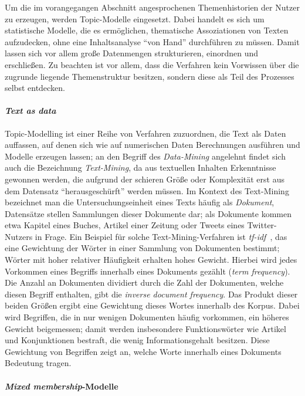 \documentclass[11pt,a4paper,twoside]{article}
\let\oldpar\paragraph
\renewcommand{\paragraph}{\oldpar*}
\begin{document}
Um die im vorangegangen Abschnitt angesprochenen Themenhistorien der
Nutzer zu erzeugen, werden Topic-Modelle eingesetzt. Dabei handelt es
sich um statistische Modelle, die es ermöglichen, thematische
Assoziationen von Texten aufzudecken, ohne eine Inhaltsanalyse
\enquote{von Hand} durchführen zu müssen. Damit lassen sich vor allem
große Datenmengen strukturieren, einordnen und erschließen. Zu beachten
ist vor allem, dass die Verfahren kein Vorwissen über die zugrunde
liegende Themenstruktur besitzen, sondern diese als Teil des Prozesses
selbst entdecken.

\hypertarget{text-as-data}{%
\paragraph{\texorpdfstring{\emph{Text as
data}}{Text as data}}\label{text-as-data}}

Topic-Modelling ist einer Reihe von Verfahren zuzuordnen, die Text als
Daten auffassen, auf denen sich wie auf numerischen Daten Berechnungen
ausführen und Modelle erzeugen lassen; an den Begriff des
\emph{Data-Mining} angelehnt findet sich auch die Bezeichnung
\emph{Text-Mining}, da aus textuellen Inhalten Erkenntnisse gewonnen
werden, die aufgrund der schieren Größe oder Komplexität erst aus dem
Datensatz \enquote{herausgeschürft} werden müssen. Im Kontext des
Text-Mining bezeichnet man die Untersuchungseinheit eines Texts häufig
als \emph{Dokument}, Datensätze stellen Sammlungen dieser Dokumente dar;
als Dokumente kommen etwa Kapitel eines Buches, Artikel einer Zeitung
oder Tweets eines Twitter-Nutzers in Frage. Ein Beispiel für solche
Text-Mining-Verfahren ist \emph{tf-idf}~\autocite[S. 63]{Salton1983},
das eine Gewichtung der Wörter in einer Sammlung von Dokumenten
bestimmt; Wörter mit hoher relativer Häufigkeit erhalten hohes Gewicht.
Hierbei wird jedes Vorkommen eines Begriffs innerhalb eines Dokuments
gezählt (\emph{term frequency}). Die Anzahl an Dokumenten dividiert
durch die Zahl der Dokumenten, welche diesen Begriff enthalten, gibt die
\emph{inverse document frequency}. Das Produkt dieser beiden Größen
ergibt eine Gewichtung dieses Wortes innerhalb des Korpus. Dabei wird
Begriffen, die in nur wenigen Dokumenten häufig vorkommen, ein höheres
Gewicht beigemessen; damit werden insbesondere Funktionswörter wie
Artikel und Konjunktionen bestraft, die wenig Informationsgehalt
besitzen. Diese Gewichtung von Begriffen zeigt an, welche Worte
innerhalb eines Dokuments Bedeutung tragen.

\hypertarget{mixed-membership-modelle}{%
\paragraph{\texorpdfstring{\emph{Mixed
membership}-Modelle}{Mixed membership-Modelle}}\label{mixed-membership-modelle}}
\end{document}
